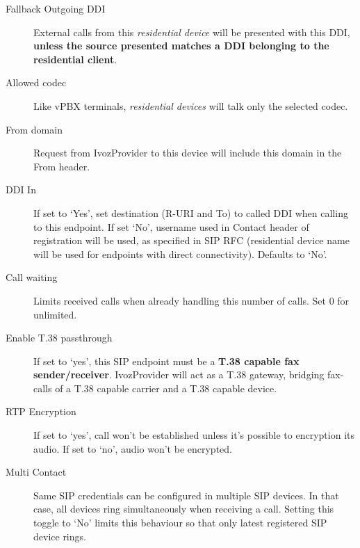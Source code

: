 \documentclass[letterpaper,10pt,spanish]{sphinxmanual}
\begin{document}
\begin{description}
\item[{Fallback Outgoing DDI}] \leavevmode{}\label{administration_portal/client/residential/residential_devices:term-fallback-outgoing-ddi}
External calls from this \emph{residential device} will be presented with this DDI, \textbf{unless
the source presented matches a DDI belonging to the residential client}.

\item[{Allowed codec}] \leavevmode{}\label{administration_portal/client/residential/residential_devices:term-allowed-codec}
Like vPBX terminals, \emph{residential devices} will talk only the selected codec.

\item[{From domain}] \leavevmode{}\label{administration_portal/client/residential/residential_devices:term-from-domain}
Request from IvozProvider to this device will include this domain in
the From header.

\item[{DDI In}] \leavevmode{}\label{administration_portal/client/residential/residential_devices:term-ddi-in}
If set to `Yes', set destination (R-URI and To) to called DDI when calling to this endpoint. If set `No', username
used in Contact header of registration will be used, as specified in SIP RFC (residential device name will be used
for endpoints with direct connectivity). Defaults to `No'.

\item[{Call waiting}] \leavevmode{}\label{administration_portal/client/residential/residential_devices:term-call-waiting}
Limits received calls when already handling this number of calls. Set 0 for unlimited.

\item[{Enable T.38 passthrough}] \leavevmode{}\label{administration_portal/client/residential/residential_devices:term-enable-t-38-passthrough}
If set to `yes', this SIP endpoint must be a \textbf{T.38 capable fax sender/receiver}. IvozProvider
will act as a T.38 gateway, bridging fax-calls of a T.38 capable carrier and a T.38 capable device.

\item[{RTP Encryption}] \leavevmode{}\label{administration_portal/client/residential/residential_devices:term-rtp-encryption}
If set to `yes', call won't be established unless it's possible to encryption its audio. If set to `no',
audio won't be encrypted.

\item[{Multi Contact}] \leavevmode{}\label{administration_portal/client/residential/residential_devices:term-multi-contact}
Same SIP credentials can be configured in multiple SIP devices. In that case, all devices ring
simultaneously when receiving a call. Setting this toggle to `No' limits this behaviour so that
only latest registered SIP device rings.

\end{description}
\end{document}
